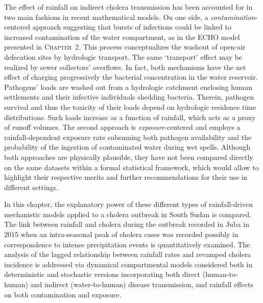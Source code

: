 The effect of rainfall on indirect cholera transmission has been accounted for in two main fashions in recent mathematical models. On one side, a \textit{contamination}-centered approach suggesting that bursts of infections could be linked to increased contamination of the water compartment, as in the ECHO model presented in \textsc{Chapter~2}. This process conceptualizes the washout of open-air defecation sites by hydrologic transport. The same `transport' effect may be realized by sewer collectors' overflows. In fact, both mechanisms have the net effect of charging progressively the bacterial concentration in the water reservoir. Pathogens' loads are washed out from a hydrologic catchment enclosing human settlements and their infective individuals shedding bacteria. Therein, pathogen survival and thus the toxicity of their loads depend on hydrologic residence time distributions. Such loads increase as a function of rainfall, which acts as a proxy of runoff volumes. The second approach is \textit{exposure}-centered and employs a rainfall-dependent exposure rate subsuming both pathogen availability and the probability of the ingestion of contaminated water during wet spells. Although both approaches are physically plausible, they have not been compared directly on the same datasets within a formal statistical framework, which would allow to highlight their respective merits and further recommendations for their use in different settings.

In this chapter, the explanatory power of these different types of rainfall-driven mechanistic models applied to a cholera outbreak in South Sudan is compared. The link between rainfall and cholera during the outbreak recorded in Juba in 2015 when an intra-seasonal peak of cholera cases was recorded possibly in correspondence to intense precipitation events is quantitatively examined. The analysis of the lagged relationship between rainfall rates and revamped cholera incidence is addressed via dynamical compartmental models considered both in deterministic and stochastic versions incorporating both direct (human-to-human) and indirect (water-to-human) disease transmission, and rainfall effects on both contamination and exposure.
